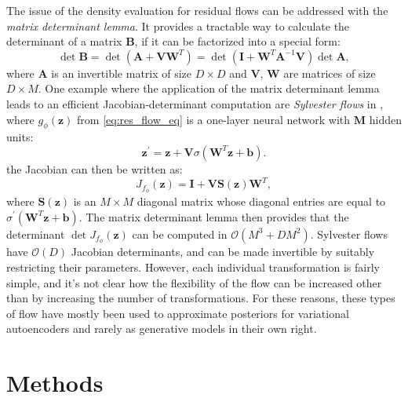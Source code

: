 \documentclass[english]{scrartcl}
\begin{document}
    The issue of the density evaluation for residual flows can be addressed with the \textit{matrix determinant lemma}.
    It provides a tractable way to calculate the determinant of a matrix $\textbf{B}$, if it can be factorized into a special form:
    \begin{equation}
        \det\textbf{B} = \det\left(\textbf{A} + \textbf{V}\textbf{W}^T\right) = \det\left(\textbf{I} + \textbf{W}^T \textbf{A}^{-1}\textbf{V} \right)\det \textbf{A},
    \end{equation}
    where $\textbf{A}$ is an invertible matrix of size $D \times D$ and $\textbf{V}$, $\textbf{W}$ are matrices of size $D \times M$.
    One example where the application of the matrix determinant lemma leads to an efficient Jacobian-determinant computation are \textit{Sylvester flows} in \citet{berg_sylvester_2019}, where $g_{\phi} (\textbf{z})$ from \cref{eq:res_flow_eq} is a one-layer neural network with $\textbf{M}$ hidden units:
    \begin{equation}
        \textbf{z} ^{\prime} = \textbf{z} + \textbf{V} \sigma \left ( \textbf{W}^T \textbf{z} + \textbf{b}\right).
    \end{equation}
    the Jacobian can then be written as:
    \begin{equation}
        J_{f_{\phi}}(\textbf{z}) = \textbf{I} + \textbf{V}\textbf{S}(\textbf{z})\textbf{W}^T,
    \end{equation}
    where $\textbf{S}(\textbf{z})$ is an $M \times M$ diagonal matrix whose diagonal entries are equal to $\sigma ^{\prime} \left( \textbf{W}^T \textbf{z} + \textbf{b} \right)$.
    The matrix determinant lemma then provides that the determinant $\det J_{f_{\phi}}(\textbf{z})$ can be computed in $\mathcal{O}\left( M^3 + DM^2 \right)$.
    Sylvester flows have $\mathcal{O}(D)$ Jacobian determinants, and can be made invertible by suitably restricting their parameters.
    However, each individual transformation is fairly simple, and it's not clear how the flexibility of the flow can be increased other than by increasing the number of transformations.
    For these reasons, these types of flow have mostly been used to approximate posteriors for variational autoencoders and rarely as generative models in their own right.


    \section{Methods}
\end{document}
